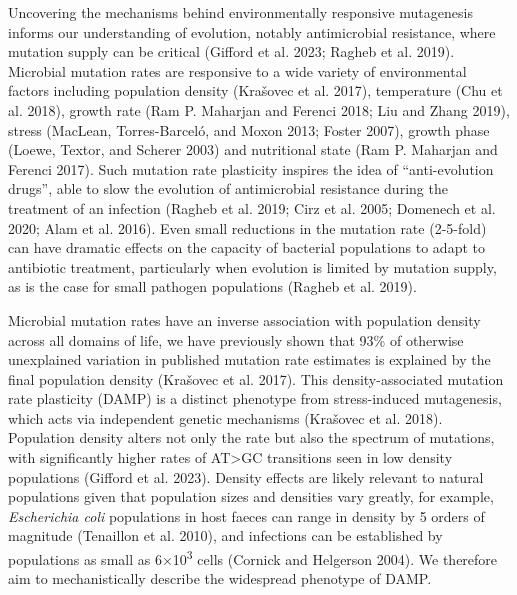 \documentclass[
  12pt,
  letterpaper,
  DIV=11,
  numbers=noendperiod]{scrreprt}
\begin{document}
Uncovering the mechanisms behind environmentally responsive mutagenesis
informs our understanding of evolution, notably antimicrobial
resistance, where mutation supply can be critical (Gifford et al. 2023;
Ragheb et al. 2019). Microbial mutation rates are responsive to a wide
variety of environmental factors including population density (Krašovec
et al. 2017), temperature (Chu et al. 2018), growth rate (Ram P.
Maharjan and Ferenci 2018; Liu and Zhang 2019), stress (MacLean,
Torres-Barceló, and Moxon 2013; Foster 2007), growth phase (Loewe,
Textor, and Scherer 2003) and nutritional state (Ram P. Maharjan and
Ferenci 2017). Such mutation rate plasticity inspires the idea of
``anti-evolution drugs'', able to slow the evolution of antimicrobial
resistance during the treatment of an infection (Ragheb et al. 2019;
Cirz et al. 2005; Domenech et al. 2020; Alam et al. 2016). Even small
reductions in the mutation rate (2-5-fold) can have dramatic effects on
the capacity of bacterial populations to adapt to antibiotic treatment,
particularly when evolution is limited by mutation supply, as is the
case for small pathogen populations (Ragheb et al. 2019).

Microbial mutation rates have an inverse association with population
density across all domains of life, we have previously shown that 93\%
of otherwise unexplained variation in published mutation rate estimates
is explained by the final population density (Krašovec et al. 2017).
This density-associated mutation rate plasticity (DAMP) is a distinct
phenotype from stress-induced mutagenesis, which acts via independent
genetic mechanisms (Krašovec et al. 2018). Population density alters not
only the rate but also the spectrum of mutations, with significantly
higher rates of AT\textgreater GC transitions seen in low density
populations (Gifford et al. 2023). Density effects are likely relevant
to natural populations given that population sizes and densities vary
greatly, for example, \emph{Escherichia coli} populations in host faeces
can range in density by 5 orders of magnitude (Tenaillon et al. 2010),
and infections can be established by populations as small as
6×10\textsuperscript{3} cells (Cornick and Helgerson 2004). We therefore
aim to mechanistically describe the widespread phenotype of DAMP.
\end{document}
